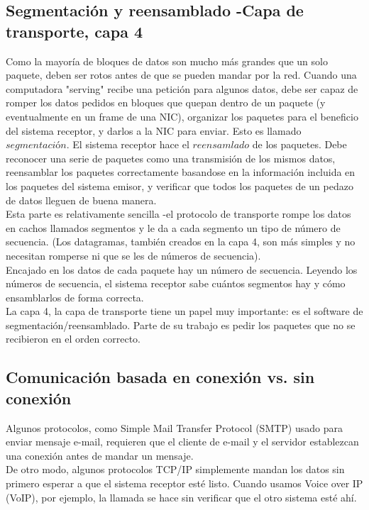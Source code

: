 \documentclass[12pt]{report}
\begin{document}
\subsection{Segmentación y reensamblado -Capa de transporte, capa 4}
Como la mayoría de bloques de datos son mucho más grandes que un 
solo paquete, deben ser rotos antes de que se pueden mandar por la red.
Cuando una computadora "serving" recibe una petición para algunos datos,
debe ser capaz de romper los datos pedidos en bloques que quepan
dentro de un paquete (y eventualmente en un frame de una NIC),
organizar los paquetes para el beneficio del sistema receptor, y darlos
a la NIC para enviar. Esto es llamado $\textit{segmentación}$.
El sistema receptor hace el $\textit{reensamlado}$ de los paquetes.
Debe reconocer una serie de paquetes como una transmisión de los mismos datos,
reensamblar los paquetes correctamente basandose en la información 
incluida en los paquetes del sistema emisor, y verificar que todos
los paquetes de un pedazo de datos lleguen de buena manera.\\
Esta parte es relativamente sencilla -el protocolo de transporte 
rompe los datos en cachos llamados segmentos y le da a cada segmento
un tipo de número de secuencia. (Los datagramas, también creados en la capa 4,
son más simples y no necesitan romperse ni que se les de números
de secuencia).\\
Encajado en los datos de cada paquete hay un número de secuencia.
Leyendo los números de secuencia, el sistema receptor sabe cuántos segmentos
hay y cómo ensamblarlos de forma correcta.\\
La capa 4, la capa de transporte tiene un papel muy importante: 
es el software de segmentación/reensamblado. Parte de su trabajo es pedir
los paquetes que no se recibieron en el orden correcto.

\subsection{Comunicación basada en conexión vs. sin conexión}
Algunos protocolos, como Simple Mail Transfer Protocol (SMTP) usado
para enviar mensaje e-mail, requieren que el cliente de e-mail y el servidor
establezcan una conexión antes de mandar un mensaje.\\
De otro modo, algunos protocolos TCP/IP simplemente mandan los datos 
sin primero esperar a que el sistema receptor esté listo.
Cuando usamos Voice over IP (VoIP), por ejemplo, la llamada se hace
sin verificar que el otro sistema esté ahí.\\
\end{document}
